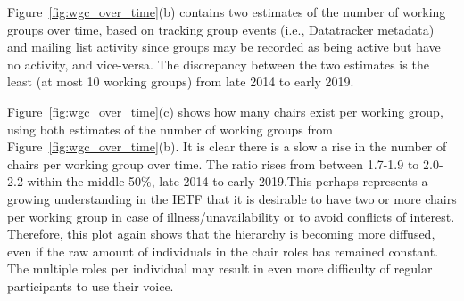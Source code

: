 \documentclass[twocolumn,10pt]{article}
\begin{document}
Figure~\ref{fig:wgc_over_time}(b) contains two estimates of the number of
working groups over time, based on tracking group events (i.e., Datatracker
metadata) and mailing list activity since groups may be recorded as being
active but have no activity, and vice-versa.  The discrepancy between the
two estimates is the least (at most 10 working groups) from late 2014 to
early 2019. 

Figure~\ref{fig:wgc_over_time}(c) shows how many chairs exist per working
group, using both estimates of the number of working groups from
Figure~\ref{fig:wgc_over_time}(b). It is clear there is a slow a rise in
the number of chairs per working group over time. The ratio rises from
between 1.7-1.9 to 2.0-2.2 within the middle 50\%, late 2014 to early
2019.This perhaps represents a growing understanding in the IETF that it is
desirable to have two or more chairs per working group in case of
illness/unavailability or to avoid conflicts of interest. Therefore, this
plot again shows that the hierarchy is becoming more diffused, even if the
raw amount of individuals in the chair roles has remained constant. The
multiple roles per individual may result in even more difficulty of regular
participants to use their voice.
\end{document}
